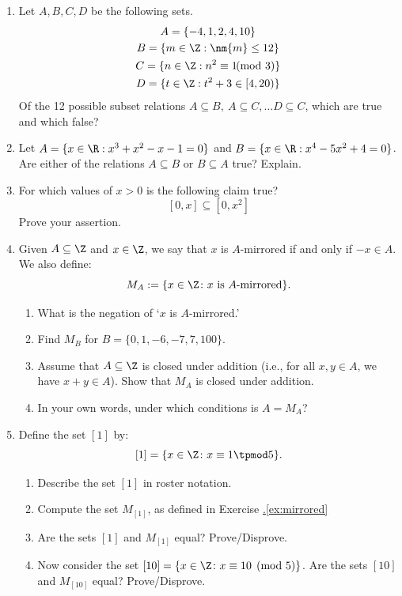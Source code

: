 \begin{enumerate}\renewcommand{\labelenumi}{\thesubsection.\theenumi}
  \item Let $A,B,C,D$ be the following sets.
  \begin{gather*}
  A=\{-4,1,2,4,10\}\\
  B=\{m\in\Z:\nm{m}\le 12\}\\
  C=\{n\in\Z:n^2\equiv 1\negthickspace\negthickspace\pmod 3\}\\
  D=\{t\in\Z:t^2+3\in [4,20)\}  
  \end{gather*}
  Of the 12 possible subset relations $A\subseteq B,\ A\subseteq C,\ldots D\subseteq C$, which are true and which false?
  
  \item Let $A=\{x\in\R:x^3+x^2-x-1=0\}$ and $B=\{x\in\R:x^4-5x^2+4=0\}$. Are either of the relations $A\subseteq B$ or $B\subseteq A$ true? Explain.
  
  \item For which values of $x>0$ is the following claim true?
  \[[0,x]\subseteq[0,x^2]\]
  Prove your assertion.
  
  \item\label{ex:mirrored} Given $A\subseteq\Z$ and $x\in\Z$, we say that $x$ is $A$-mirrored if and only if $-x\in A$. We also define:
  \[M_A:=\{x\in\Z\colon x\text{ is $A$-mirrored}\}.\]
		\begin{enumerate}
	  	\item What is the negation of `$x$ is $A$-mirrored.'
	  	\item Find $M_B$ for $B=\{0,1,-6,-7,7,100\}$.
	  	\item Assume that $A \subseteq\Z$ is closed under addition (i.e., for all $x,y\in A$, we have $x+y\in A$). Show that $M_A$ is closed under addition.
	  	\item In your own words, under which conditions is $A=M_A$?
		\end{enumerate}

  \item Define the set $ [1] $ by:
	\[[1]=\{x\in\Z\colon x\equiv 1\tpmod 5\}.\]
		\begin{enumerate}
		  \item Describe the set $[1]$ in roster notation.
		  \item Compute the set $M_{[1]}$, as defined in Exercise \hyperref[ex:mirrored]{\thesubsection.\ref*{ex:mirrored}}
			\item Are the sets $[1]$ and $M_{[1]}$ equal? Prove/Disprove.
			\item Now consider the set $[10]=\{x\in\Z\colon x\equiv 10 \pmod 5\}$. Are the sets $[10]$ and $M_{[10]}$ equal? Prove/Disprove.
  	\end{enumerate}
  	

\end{enumerate}
